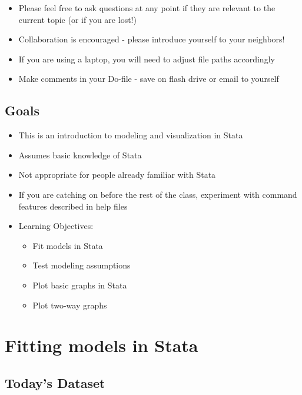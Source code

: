 \documentclass[]{book}
\providecommand{\tightlist}{%
  \setlength{\itemsep}{0pt}\setlength{\parskip}{0pt}}
\begin{document}
\begin{itemize}
\tightlist
\item
  Please feel free to ask questions at any point if they are relevant to the current topic (or if you are lost!)
\item
  Collaboration is encouraged - please introduce yourself to your neighbors!
\item
  If you are using a laptop, you will need to adjust file paths accordingly
\item
  Make comments in your Do-file - save on flash drive or email to yourself
\end{itemize}

\hypertarget{goals-2}{%
\subsection{Goals}\label{goals-2}}

\begin{itemize}
\tightlist
\item
  This is an introduction to modeling and visualization in Stata
\item
  Assumes basic knowledge of Stata
\item
  Not appropriate for people already familiar with Stata
\item
  If you are catching on before the rest of the class, experiment with command features described in help files
\item
  Learning Objectives:

  \begin{itemize}
  \tightlist
  \item
    Fit models in Stata
  \item
    Test modeling assumptions
  \item
    Plot basic graphs in Stata
  \item
    Plot two-way graphs
  \end{itemize}
\end{itemize}

\hypertarget{fitting-models-in-stata}{%
\section{Fitting models in Stata}\label{fitting-models-in-stata}}

\hypertarget{todays-dataset}{%
\subsection{Today's Dataset}\label{todays-dataset}}
\end{document}
